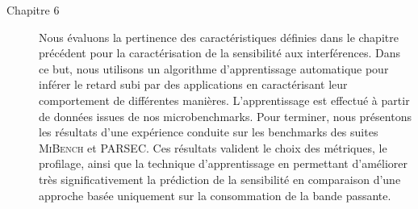 \begin{description}
	\item [Chapitre 6] Nous évaluons la pertinence des caractéristiques définies dans le chapitre précédent pour la caractérisation de la sensibilité aux interférences.
	Dans ce but, nous utilisons un algorithme d'apprentissage automatique pour inférer le retard subi par des applications en caractérisant leur comportement de différentes manières.
	L'apprentissage est effectué à partir de données issues de nos microbenchmarks.
	Pour terminer, nous présentons les résultats d'une expérience conduite sur les benchmarks des suites \textsc{MiBench} et \textsc{PARSEC}.
	Ces résultats valident le choix des métriques, le profilage, ainsi que la technique d'apprentissage en permettant d'améliorer très significativement la prédiction de la sensibilité en comparaison d'une approche basée uniquement sur la consommation de la bande passante.

\end{description}




